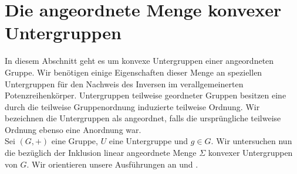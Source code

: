 \section{Die angeordnete Menge konvexer Untergruppen}
In diesem Abschnitt geht es um konvexe Untergruppen einer angeordneten Gruppe. Wir benötigen einige Eigenschaften dieser Menge an speziellen Untergruppen für den Nachweis des Inversen im verallgemeinerten Potenzreihenkörper. Untergruppen teilweise geordneter Gruppen besitzen eine durch die teilweise Gruppenordnung induzierte teilweise Ordnung. Wir bezeichnen die Untergruppen als angeordnet, falls die ursprüngliche teilweise Ordnung ebenso eine Anordnung war.\\
Sei $\left(G, +\right)$ eine Gruppe, $U$ eine Untergruppe und $g \in G$. 
Wir untersuchen nun die bezüglich der Inklusion linear angeordnete Menge $\Sigma$ konvexer Untergruppen von $G$. Wir orientieren unsere Ausführungen an \cite[S. 81 - 83]{fuchs66}  und \cite[S. 3]{priesscrampe83}.

